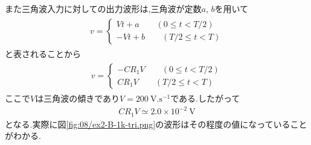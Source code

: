 また三角波入力に対しての出力波形は,三角波が定数$a$, $b$を用いて
\begin{align}
  \begin{split}
    v=
    \begin{cases}
        Vt+a\qquad(0\leq t<T/2)\\
        -Vt+b\qquad(T/2\leq t<T)
    \end{cases}
  \end{split}
\end{align}
と表されることから
\begin{align}
  \begin{split}
    v=
    \begin{cases}
        -CR_1V\qquad(0\leq t<T/2)\\
        CR_1V\qquad(T/2\leq t<T)
    \end{cases}
  \end{split}
\end{align}
ここで$V$は三角波の傾きであり$V=200\ \si{\volt.\second^{-1}}$である.したがって
\begin{align}
  CR_1V\simeq2.0\times10^{-2}\ \si{\volt}
\end{align}
となる.実際に図\ref{fig:08/ex2-B-1k-tri.png}の波形はその程度の値になっていることがわかる.